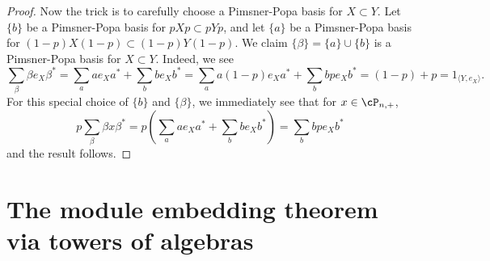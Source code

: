 \documentclass[11pt]{article}
\theoremstyle{plain}
\theoremstyle{definition}
\newcommand{\nn}[1]{\textcolor{red}{[[#1]]}}
\begin{document}
\begin{proof}
Now the trick is to carefully choose a Pimsner-Popa basis for $X\subset Y$.
Let $\{b\}$ be a Pimsner-Popa basis for $pXp\subset pYp$, and let $\{a\}$ be a Pimsner-Popa basis for $(1-p)X(1-p) \subset (1-p)Y(1-p)$.
We claim $\{\beta\}=\{a\}\cup \{b\}$ is a Pimsner-Popa basis for $X\subset Y$.
Indeed, we see
$$
\sum_{\beta} \beta e_X \beta^*
=
\sum_{a} ae_X a^* + \sum_{b} be_X b^* 
=
\sum_{a} a(1-p)e_X a^* + \sum_{b} bpe_X b^* 
=
(1-p) + p
= 
1_{\langle Y, e_X\rangle}.
$$
For this special choice of $\{b\}$ and $\{\beta\}$, we immediately see that for $x\in \cP_{n,+}$,
$$
p\sum_{\beta} \beta x\beta^* 
= 
p\left(\sum_{a} ae_X a^* + \sum_{b} be_X b^* \right)
=
\sum_{b} bpe_X b^*
$$
and the result follows.
%
%
\end{proof}



\section{The module embedding theorem via towers of algebras}






\end{document}
